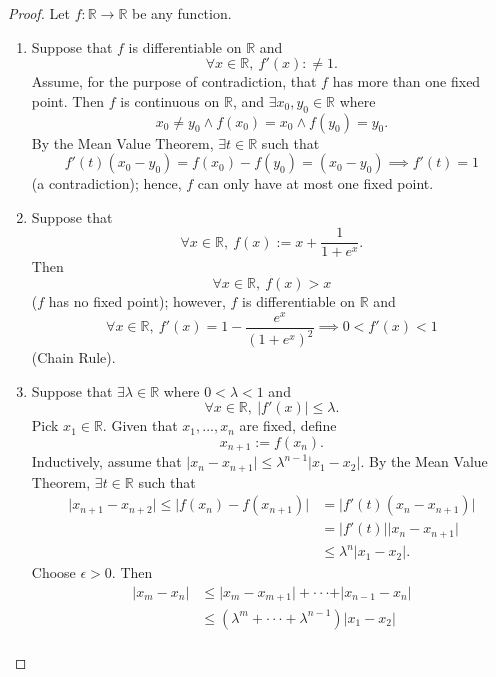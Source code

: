 \documentclass{amsart}
\theoremstyle{definition}
\begin{document}
\begin{proof}
    Let $f: \mathbb{R} \to \mathbb{R}$ be any function. 
    \begin{enumerate}[label = (\alph*)]
        \item Suppose that $f$ is differentiable on $\mathbb{R}$ and 
        \[
        \forall x \in \mathbb{R}, \ f'(x) :\neq 1.
        \]
        Assume, for the purpose of contradiction, that $f$ has more than one fixed point. Then $f$ is continuous on $\mathbb{R}$, and $\exists x_0,y_0 \in \mathbb{R}$ where 
        \[
        x_0 \neq y_0 \land f(x_0) = x_0 \land f(y_0) = y_0.
        \]
        By the Mean Value Theorem, $\exists t \in \mathbb{R}$ such that
        \[
        f'(t)(x_0 - y_0) = f(x_0) - f(y_0) = (x_0 - y_0) \implies f'(t) = 1
        \]
        (a contradiction); hence, $f$ can only have at most one fixed point.
        \item Suppose that 
        \[
        \forall x \in \mathbb{R}, \ f(x) := x + \frac{1}{1 + e^x}.
        \]
        Then 
        \[
        \forall x \in \mathbb{R}, \ f(x) > x
        \]
        ($f$ has no fixed point); however, $f$ is differentiable on $\mathbb{R}$ and 
        \[
        \forall x \in \mathbb{R}, \ f'(x) = 1 - \frac{e^x}{(1 + e^x)^2} \implies 0 < f'(x) < 1
        \]
        (Chain Rule).
        \item Suppose that $\exists \lambda \in \mathbb{R}$ where $0 < \lambda < 1$ and 
        \[
        \forall x \in \mathbb{R}, \ \vert f'(x) \vert \leq \lambda.
        \]
        Pick $x_1 \in \mathbb{R}$. Given that $x_1,...,x_n$ are fixed, define
        \[
        x_{n + 1} := f(x_n).
        \]
        Inductively, assume that $\vert x_n - x_{n+1} \vert \leq \lambda^{n-1}\vert x_1 - x_2\vert$. By the Mean Value Theorem, $\exists t \in \mathbb{R}$ such that 
        \begin{align*}
            \vert x_{n+1} - x_{n+2} \vert \leq \vert f(x_n) - f(x_{n+1}) \vert &= \vert f'(t) (x_n - x_{n+1}) \vert \\
            &= \vert f'(t) \vert \vert x_n - x_{n+1} \vert \\
            &\leq \lambda^n\vert x_1 - x_2 \vert.
        \end{align*}
        Choose $\epsilon > 0$. Then  
        \begin{align*}
            \vert x_m - x_n \vert &\leq \vert x_m - x_{m+1} \vert + \cdot \cdot \cdot + \vert x_{n-1} - x_n \vert \\ 
            &\leq (\lambda^m + \cdot \cdot \cdot + \lambda^{n-1})\vert x_1 - x_2 \vert \\

\end{align*}
\end{enumerate}
\end{proof}
\end{document}
